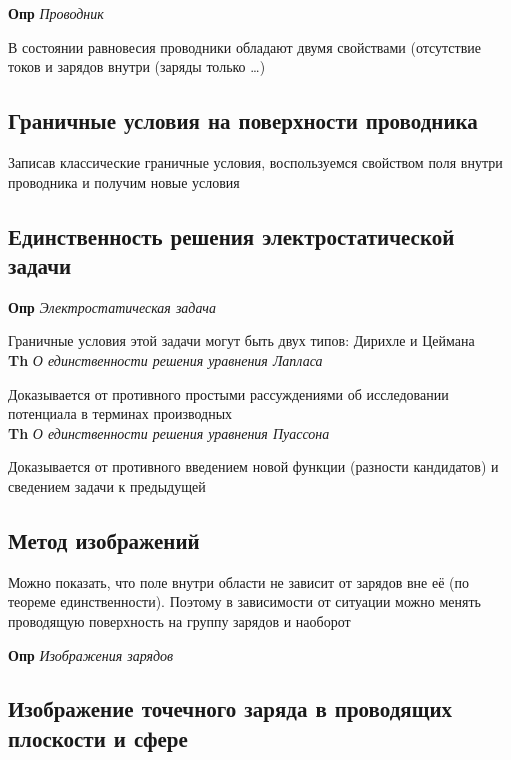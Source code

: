 \documentclass[a4paper, 14pt]{article}
\begin{document}
    \textbf{Опр} \textit{Проводник}
    
    В состоянии равновесия проводники обладают двумя свойствами (отсутствие токов и зарядов внутри (заряды только \ldots)
    
    \subsection{Граничные условия на поверхности проводника}
    
    Записав классические граничные условия, воспользуемся свойством поля внутри проводника и получим новые условия
    
    \subsection{Единственность решения электростатической задачи}
    
    \textbf{Опр} \textit{Электростатическая задача}
    
    Граничные условия этой задачи могут быть двух типов: Дирихле и Цеймана \\
    
    \textbf{Th} \textit{О единственности решения уравнения Лапласа}
    
    Доказывается от противного простыми рассуждениями об исследовании потенциала в терминах производных \\
    
    \textbf{Th} \textit{О единственности решения уравнения Пуассона}
    
    Доказывается от противного введением новой функции (разности кандидатов) и сведением задачи к предыдущей
    
    \subsection{Метод изображений}
    
    Можно показать, что поле внутри области не зависит от зарядов вне её (по теореме единственности).
    Поэтому в зависимости от ситуации можно менять проводящую поверхность на группу зарядов и наоборот
    
    \textbf{Опр} \textit{Изображения зарядов}
    
    \subsection{Изображение точечного заряда в проводящих плоскости и сфере}
    
\end{document}

